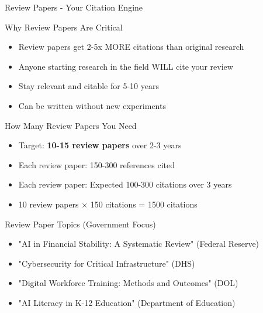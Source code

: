 \documentclass[11pt]{beamer}
\begin{document}
	\begin{frame}{Review Papers - Your Citation Engine}
		\scriptsize
		\begin{block}{Why Review Papers Are Critical}
			\begin{itemize}
				\item Review papers get 2-5x MORE citations than original research
				\item Anyone starting research in the field WILL cite your review
				\item Stay relevant and citable for 5-10 years
				\item Can be written without new experiments
			\end{itemize}
		\end{block}
		\begin{block}{How Many Review Papers You Need}
			\begin{itemize}
				\item Target: \textbf{10-15 review papers} over 2-3 years
				\item Each review paper: 150-300 references cited
				\item Each review paper: Expected 100-300 citations over 3 years
				\item 10 review papers × 150 citations = 1500 citations
			\end{itemize}
		\end{block}
		\begin{block}{Review Paper Topics (Government Focus)}
			\begin{itemize}
				\item "AI in Financial Stability: A Systematic Review" (Federal Reserve)
				\item "Cybersecurity for Critical Infrastructure" (DHS)
				\item "Digital Workforce Training: Methods and Outcomes" (DOL)
				\item "AI Literacy in K-12 Education" (Department of Education)
			\end{itemize}
		\end{block}
	\end{frame}
	
\end{document}
